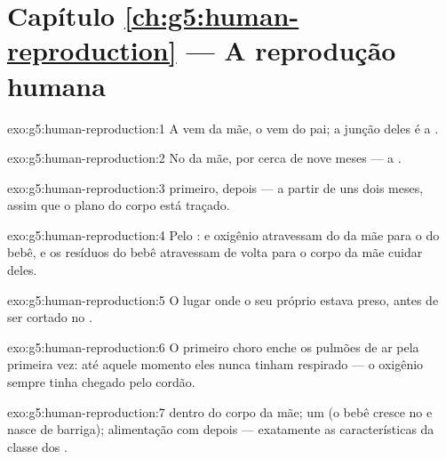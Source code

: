 \section*{Capítulo \ref{ch:g5:human-reproduction} --- A reprodução humana}

\begin{solution}{exo:g5:human-reproduction:1}
A  vem da mãe, o  vem do
pai; a junção deles é a .
\end{solution}

\begin{solution}{exo:g5:human-reproduction:2}
No  da mãe, por cerca de nove meses --- a .
\end{solution}

\begin{solution}{exo:g5:human-reproduction:3}
 primeiro, depois  --- a partir de uns dois meses, assim
que o plano do corpo está traçado.
\end{solution}

\begin{solution}{exo:g5:human-reproduction:4}
Pelo :  e oxigênio atravessam do  da
mãe para o do bebê, e os resíduos do bebê atravessam de volta para o
corpo da mãe cuidar deles.
\end{solution}

\begin{solution}{exo:g5:human-reproduction:5}
O lugar onde o seu próprio  estava preso, antes de
ser cortado no .
\end{solution}

\begin{solution}{exo:g5:human-reproduction:6}
O primeiro choro enche os pulmões de ar pela primeira vez: até
aquele momento eles nunca tinham respirado --- o oxigênio sempre
tinha chegado pelo cordão.
\end{solution}

\begin{solution}{exo:g5:human-reproduction:7}
 dentro do corpo da mãe; um   (o bebê
cresce no  e nasce de barriga); alimentação com  depois
--- exatamente as características da classe dos .
\end{solution}

